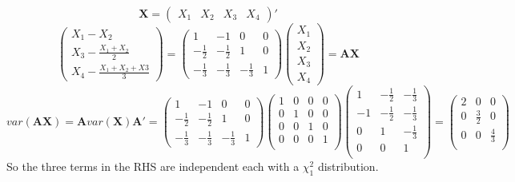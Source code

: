 \documentclass[a4papers]{ctexart}
\begin{document}
  \[ \boldsymbol{X}=
    \begin{pmatrix}X_1 & X_2 & X_3 &X_4 \end{pmatrix} '
    \]
\[
    \begin{pmatrix}X_1-X_2 \\ X_3-\frac{X_1+X_2}{2} \\ X_4-\frac{X_1+X_2+X3}{3} \end{pmatrix}
    = \begin{pmatrix} 1 & -1 & 0 & 0 \\
                     -\frac{1}{2} & -\frac{1}{2} & 1 & 0 \\
                     -\frac{1}{3} & -\frac{1}{3} & -\frac{1}{3} & 1
    \end{pmatrix} \begin{pmatrix}X_1 \\ X_2 \\ X_3 \\ X_4\end{pmatrix}
    =\boldsymbol{AX}
    \]
\[
    var( \boldsymbol{AX} ) = \boldsymbol{A}var(\boldsymbol{X})\boldsymbol{A}'
= \begin{pmatrix} 1 & -1 & 0 & 0 \\
                     -\frac{1}{2} & -\frac{1}{2} & 1 & 0 \\
                     -\frac{1}{3} & -\frac{1}{3} & -\frac{1}{3} & 1
    \end{pmatrix}
    \begin{pmatrix} 1 & 0 & 0 & 0 \\
                    0 & 1 & 0 & 0 \\
                    0 & 0 & 1 & 0 \\
                    0 & 0 & 0 & 1 \\
    \end{pmatrix}
    \begin{pmatrix} 1 & -\frac{1}{2} & -\frac{1}{3} \\
                    -1 & -\frac{1}{2} & -\frac{1}{3}\\
                    0 & 1 & -\frac{1}{3}\\
                    0 & 0 & 1\\
    \end{pmatrix}
=    \begin{pmatrix} 2 & 0 & 0 \\
                    0 & \frac{3}{2} & 0  \\
                    0 & 0 & \frac{4}{3}  \\
    \end{pmatrix}
\]
So the three terms in the RHS are independent each with a $\chi_1^2$ distribution.
\end{document}
